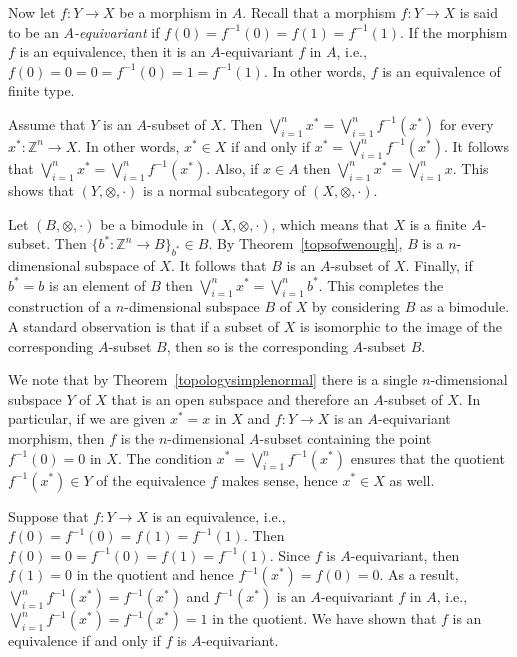 \documentclass[a4paper,reqno,oneside]{article}
\begin{document}
Now let $f:Y\to X$ be a morphism in $A$. Recall that a morphism $f:Y\to X$ is said to be an \emph{$A$-equivariant} if $f(0)=f^{-1}(0)=f(1)=f^{-1}(1)$. If the morphism $f$ is an equivalence, then it is an $A$-equivariant $f$ in $A$, i.e., $f(0)=0=0=f^{-1}(0)=1=f^{-1}(1)$. In other words, $f$ is an equivalence of finite type. 

Assume that $Y$ is an $A$-subset of $X$. Then $\bigvee_{i=1}^n x^*=\bigvee_{i=1}^n f^{-1}(x^*)$ for every $x^*:\mathbb{Z}^n\to X$. In other words, $x^*\in X$ if and only if $x^*=\bigvee_{i=1}^n f^{-1}(x^*)$. It follows that $\bigvee_{i=1}^n x^*=\bigvee_{i=1}^n f^{-1}(x^*)$. Also, if $x\in A$ then $\bigvee_{i=1}^n x^*=\bigvee_{i=1}^n x$. This shows that $(Y,\otimes,\cdot)$ is a normal subcategory of $(X,\otimes,\cdot)$. 
 
Let $(B,\otimes,\cdot)$ be a bimodule in $(X,\otimes,\cdot)$, which means that $X$ is a finite $A$-subset. Then $\{b^*:\mathbb{Z}^{n}\to B\}_{b^*}\in B$. By Theorem~\ref{topsofwenough}, $B$ is a $n$-dimensional subspace of $X$. It follows that $B$ is an $A$-subset of $X$. Finally, if $b^*=b$ is an element of $B$ then $\bigvee_{i=1}^n x^*=\bigvee_{i=1}^n b^*$. This completes the construction of a $n$-dimensional subspace $B$ of $X$ by considering $B$ as a bimodule. A standard observation is that if a subset of $X$ is isomorphic to the image of the corresponding $A$-subset $B$, then so is the corresponding $A$-subset $B$. 

We note that by Theorem~\ref{topologysimplenormal} there is a single $n$-dimensional subspace $Y$ of $X$ that is an open subspace and therefore an $A$-subset of $X$. In particular, if we are given $x^*=x$ in $X$ and $f:Y\to X$ is an $A$-equivariant morphism, then $f$ is the $n$-dimensional $A$-subset containing the point $f^{-1}(0)=0$ in $X$. The condition $x^*=\bigvee_{i=1}^n f^{-1}(x^*)$ ensures that the quotient $f^{-1}(x^*)\in Y$ of the equivalence $f$ makes sense, hence $x^*\in X$ as well.  

Suppose that $f:Y\to X$ is an equivalence, i.e., $f(0)=f^{-1}(0)=f(1)=f^{-1}(1)$. Then $f(0)=0=f^{-1}(0)=f(1)=f^{-1}(1)$. Since $f$ is $A$-equivariant, then $f(1)=0$ in the quotient and hence $f^{-1}(x^*)=f(0)=0$. As a result, $\bigvee_{i=1}^n f^{-1}(x^*)=f^{-1}(x^*)$ and $f^{-1}(x^*)$ is an $A$-equivariant $f$ in $A$, i.e., $\bigvee_{i=1}^n f^{-1}(x^*)=f^{-1}(x^*)=1$ in the quotient. We have shown that $f$ is an equivalence if and only if $f$ is $A$-equivariant. 
\end{document}
